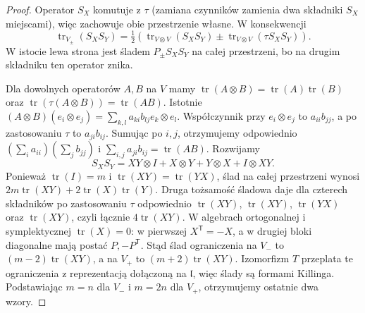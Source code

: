 \begin{proof}
Operator $S_X$ komutuje z $\tau$ (zamiana czynników
zamienia dwa składniki $S_X$ miejscami), więc
zachowuje obie przestrzenie własne. W konsekwencji
\[
 \operatorname{tr}_{V_\pm}(S_X S_Y)
 =\tfrac12\left(\operatorname{tr}_{V\otimes V}(S_X S_Y)
          \pm\operatorname{tr}_{V\otimes V}(\tau S_X S_Y)\right).
\]
W istocie lewa strona jest śladem $P_\pm S_X S_Y$
na całej przestrzeni, bo na drugim składniku
ten operator znika.

Dla dowolnych operatorów $A,B$ na $V$ mamy
$\operatorname{tr}(A\otimes B)=\operatorname{tr}(A)
\operatorname{tr}(B)$ oraz
$\operatorname{tr}(\tau(A\otimes B))=\operatorname{tr}(AB)$.
Istotnie $(A\otimes B)(e_i\otimes e_j)
=\sum_{k,l}a_{ki}b_{lj}e_k\otimes e_l$.
Współczynnik przy $e_i\otimes e_j$ to $a_{ii}b_{jj}$,
a po zastosowaniu $\tau$ to $a_{ji}b_{ij}$.
Sumując po $i,j$, otrzymujemy odpowiednio
$(\sum_i a_{ii})(\sum_j b_{jj})$ i
$\sum_{i,j}a_{ji}b_{ij}=\operatorname{tr}(AB)$.
Rozwijamy
\[
 S_XS_Y=XY\otimes I+X\otimes Y+Y\otimes X+I\otimes XY.
\]
Ponieważ $\operatorname{tr}(I)=m$ i
$\operatorname{tr}(XY)=\operatorname{tr}(YX)$,
ślad na całej przestrzeni wynosi
$2m\operatorname{tr}(XY)+2\operatorname{tr}(X)
\operatorname{tr}(Y)$. Druga tożsamość śladowa
daje dla czterech składników po zastosowaniu $\tau$
odpowiednio $\operatorname{tr}(XY)$,
$\operatorname{tr}(XY)$, $\operatorname{tr}(YX)$
oraz $\operatorname{tr}(XY)$, czyli łącznie
$4\operatorname{tr}(XY)$.
W algebrach ortogonalnej i symplektycznej
$\operatorname{tr}(X)=0$: w pierwszej
$X^{\mathsf T}=-X$, a w drugiej bloki diagonalne
mają postać $P,-P^{\mathsf T}$.
Stąd ślad ograniczenia na $V_-$ to
$(m-2)\operatorname{tr}(XY)$, a na $V_+$ to
$(m+2)\operatorname{tr}(XY)$.
Izomorfizm $T$ przeplata te ograniczenia
z reprezentacją dołączoną na $\mathfrak l$,
więc ślady są formami Killinga. Podstawiając
$m=n$ dla $V_-$ i $m=2n$ dla $V_+$,
otrzymujemy ostatnie dwa wzory.
\end{proof}

